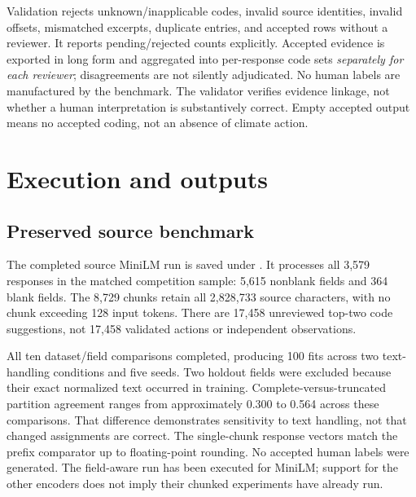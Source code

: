 \documentclass[11pt,a4paper]{article}
\begin{document}
Validation rejects unknown/inapplicable codes, invalid source identities,
invalid offsets, mismatched excerpts, duplicate entries, and accepted rows
without a reviewer. It reports pending/rejected counts explicitly.
Accepted evidence is exported in long form and aggregated into per-response
code sets \emph{separately for each reviewer}; disagreements are not
silently adjudicated. No human labels are manufactured by the benchmark.
The validator verifies evidence linkage, not whether a human interpretation
is substantively correct. Empty accepted output means no accepted coding,
not an absence of climate action.

\section{Execution and outputs}
\subsection{Preserved source benchmark}
The completed source MiniLM run is saved under
.
It processes all 3,579 responses in the matched competition sample:
5,615 nonblank fields and 364 blank fields. The 8,729 chunks retain
all 2,828,733 source characters, with no chunk exceeding 128 input tokens.
There are 17,458 unreviewed top-two code suggestions, not 17,458 validated
actions or independent observations.

All ten dataset/field comparisons completed, producing 100 fits across
two text-handling conditions and five seeds. Two holdout fields were
excluded because their exact normalized text occurred in training.
Complete-versus-truncated partition agreement ranges from approximately
0.300 to 0.564 across these comparisons. That difference demonstrates
sensitivity to text handling, not that changed assignments are correct.
The single-chunk response vectors match the prefix comparator up to
floating-point rounding. No accepted human labels were generated.
The field-aware run has been executed for MiniLM; support for the other
encoders does not imply their chunked experiments have already run.
\end{document}
